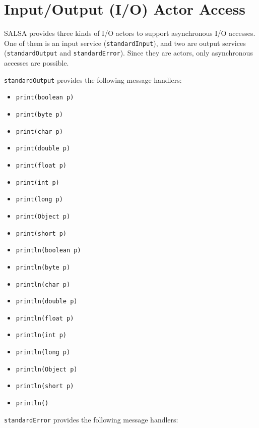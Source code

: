 \section{Input/Output (I/O) Actor Access}
SALSA provides three kinds of I/O actors to support asynchronous I/O accesses.
One of them is an input service ({\tt standardInput}), and two are 
output services ({\tt standardOutput} and {\tt standardError}).
Since they are actors, only asynchronous accesses are possible.

{\tt standardOutput} provides the following message handlers:
{\singlespace
\begin{itemize}
\item {\tt print(boolean p)}
\item {\tt print(byte p)}
\item {\tt print(char p)}
\item {\tt print(double p)}
\item {\tt print(float p)}
\item {\tt print(int p)}
\item {\tt print(long p)}
\item {\tt print(Object p)}
\item {\tt print(short p)}
\item {\tt println(boolean p)}
\item {\tt println(byte p)}
\item {\tt println(char p)}
\item {\tt println(double p)}
\item {\tt println(float p)}
\item {\tt println(int p)}
\item {\tt println(long p)}
\item {\tt println(Object p)}
\item {\tt println(short p)}
\item {\tt println()}
\end{itemize}
 }
{\tt standardError} provides the following message handlers:
